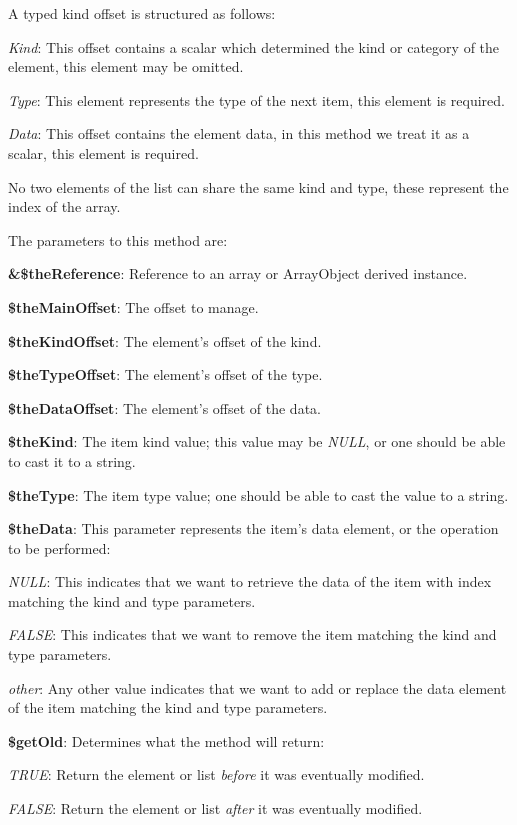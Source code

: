 A typed kind offset is structured as follows\-:


\begin{DoxyItemize}
\item {\itshape Kind}\-: This offset contains a scalar which determined the kind or category of the element, this element may be omitted. 
\item {\itshape Type}\-: This element represents the type of the next item, this element is required. 
\item {\itshape Data}\-: This offset contains the element data, in this method we treat it as a scalar, this element is required. 
\end{DoxyItemize}

No two elements of the list can share the same kind and type, these represent the index of the array.

The parameters to this method are\-:


\begin{DoxyItemize}
\item {\bfseries \&\$the\-Reference}\-: Reference to an array or Array\-Object derived instance. 
\item {\bfseries \$the\-Main\-Offset}\-: The offset to manage. 
\item {\bfseries \$the\-Kind\-Offset}\-: The element's offset of the kind. 
\item {\bfseries \$the\-Type\-Offset}\-: The element's offset of the type. 
\item {\bfseries \$the\-Data\-Offset}\-: The element's offset of the data. 
\item {\bfseries \$the\-Kind}\-: The item kind value; this value may be {\itshape N\-U\-L\-L}, or one should be able to cast it to a string. 
\item {\bfseries \$the\-Type}\-: The item type value; one should be able to cast the value to a string. 
\item {\bfseries \$the\-Data}\-: This parameter represents the item's data element, or the operation to be performed\-: 
\begin{DoxyItemize}
\item {\itshape N\-U\-L\-L}\-: This indicates that we want to retrieve the data of the item with index matching the kind and type parameters. 
\item {\itshape F\-A\-L\-S\-E}\-: This indicates that we want to remove the item matching the kind and type parameters. 
\item {\itshape other}\-: Any other value indicates that we want to add or replace the data element of the item matching the kind and type parameters. 
\end{DoxyItemize}
\item {\bfseries \$get\-Old}\-: Determines what the method will return\-: 
\begin{DoxyItemize}
\item {\itshape T\-R\-U\-E}\-: Return the element or list {\itshape before} it was eventually modified. 
\item {\itshape F\-A\-L\-S\-E}\-: Return the element or list {\itshape after} it was eventually modified. 
\end{DoxyItemize}
\end{DoxyItemize}


